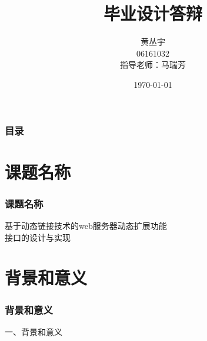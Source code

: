 \documentclass[10pt,dvipdfm]{beamer}
\begin{document}
\title[毕业设计答辩]{\LARGE{毕业设计答辩\\}}
\author[黄丛宇]{黄丛宇\\06161032\\指导老师：马瑞芳}
\date{\today}

\begin{frame}	
	\titlepage
\end{frame}

\begin{frame}
	\frametitle{目录}
	\tableofcontents
\end{frame}

\section{课题名称}
\begin{frame}
	\frametitle{课题名称}
	
	\begin{block}{}
	\begin{center}
	{\Large
			基于动态链接技术的web服务器动态扩展功能\\
				接口的设计与实现
	}
	\end{center}
	\end{block}
	
\end{frame}

\section{背景和意义}

\begin{frame}
	\frametitle{背景和意义}
	\begin{center}
	{\Large
		一、背景和意义
	}
	\end{center}
\end{frame}
\end{document}
